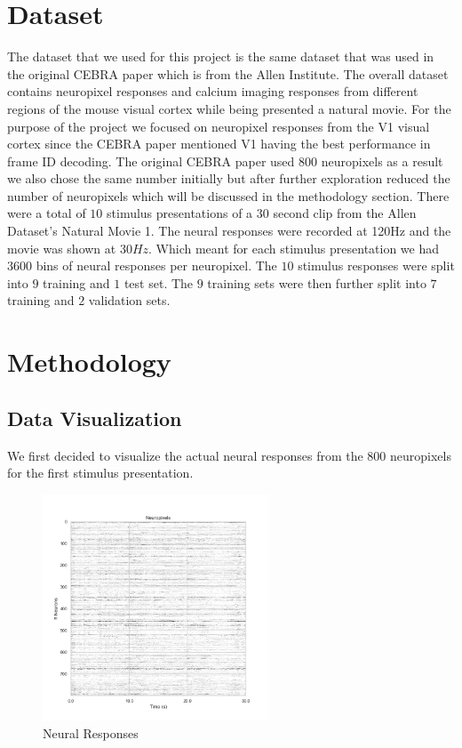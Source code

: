 \documentclass[12pt, letterpaper]{article}
\begin{document}
\section{Dataset}
The dataset that we used for this project is the same dataset that was used in the original CEBRA paper which is from the Allen Institute. The overall dataset contains neuropixel responses and calcium imaging responses from different regions of the mouse visual cortex while being presented a natural movie. For the purpose of the project we focused on neuropixel responses from the V1 visual cortex since the CEBRA paper mentioned V1 having the best performance in frame ID decoding. The original CEBRA paper used $800$ neuropixels as a result we also chose the same number initially but after further exploration reduced the number of neuropixels which will be discussed in the methodology section. There were a total of $10$ stimulus presentations of a $30$ second clip from the Allen Dataset's Natural Movie 1. The neural responses were recorded at 120Hz and the movie was shown at $30Hz$. Which meant for each stimulus presentation we had $3600$ bins of neural responses per neuropixel. The $10$ stimulus responses were split into $9$ training and $1$ test set. The $9$ training sets were then further split into $7$ training and $2$ validation sets. 

\section{Methodology}
\subsection{Data Visualization}
We first decided to visualize the actual neural responses from the 800 neuropixels for the first stimulus presentation. 

\begin{figure}[H]
    \centering
    \includegraphics[width=0.6\textwidth]{neuropixels.png}
    \caption{Neural Responses}
    \label{fig:neuropixels}
\end{figure}
\end{document}
